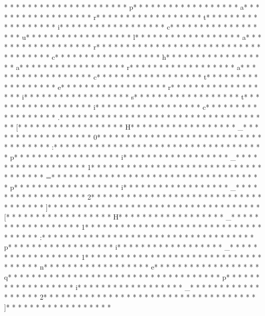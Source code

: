 * *  *  * * *  * * *  * * *  *  * * *  *  * * *  * p* * *  * * *  * * *  *  * * *  *  * * *  * a* * *  * * *  * * *  *  * * *  *  * * *  * r* * *  * * *  * * *  *  * * *  *  * * *  * t* * *  * * *  * * *  *  * * *  *  * * *  * i* * *  * * *  * * *  *  * * *  *  * * *  * c* * *  * * *  * * *  *  * * *  *  * * *  * u* * *  * * *  * * *  *  * * *  *  * * *  * l* * *  * * *  * * *  *  * * *  *  * * *  * a* * *  * * *  * * *  *  * * *  *  * * *  * r* * *  * * *  * * *  *  * * *  *  * * *  *  * * *  * * *  * * *  *  * * *  *  * * *  * c* * *  * * *  * * *  *  * * *  *  * * *  * h* * *  * * *  * * *  *  * * *  *  * * *  * a* * *  * * *  * * *  *  * * *  *  * * *  * r* * *  * * *  * * *  *  * * *  *  * * *  * a* * *  * * *  * * *  *  * * *  *  * * *  * c* * *  * * *  * * *  *  * * *  *  * * *  * t* * *  * * *  * * *  *  * * *  *  * * *  * e* * *  * * *  * * *  *  * * *  *  * * *  * r* * *  * * *  * * *  *  * * *  *  * * *  * i* * *  * * *  * * *  *  * * *  *  * * *  * s* * *  * * *  * * *  *  * * *  *  * * *  * t* * *  * * *  * * *  *  * * *  *  * * *  * i* * *  * * *  * * *  *  * * *  *  * * *  * c* * *  * * *  * * *  *  * * *  *  * * *  * .* * *  * * *  * * *  *  * * *  *  * * *  * 
* * *  * * *  * * *  *  * * *  *  * * *  * [* * *  * * *  * * *  *  * * *  *  * * *  * H* * *  * * *  * * *  *  * * *  *  * * *  * _* * *  * * *  * * *  *  * * *  *  * * *  * 0* * *  * * *  * * *  *  * * *  *  * * *  *  * * *  * * *  * * *  *  * * *  *  * * *  * :* * *  * * *  * * *  *  * * *  *  * * *  *  * * *  * * *  * * *  *  * * *  *  * * *  * p* * *  * * *  * * *  *  * * *  *  * * *  * i* * *  * * *  * * *  *  * * *  *  * * *  * _* * *  * * *  * * *  *  * * *  *  * * *  * 1* * *  * * *  * * *  *  * * *  *  * * *  *  * * *  * * *  * * *  *  * * *  *  * * *  * =* * *  * * *  * * *  *  * * *  *  * * *  *  * * *  * * *  * * *  *  * * *  *  * * *  * p* * *  * * *  * * *  *  * * *  *  * * *  * i* * *  * * *  * * *  *  * * *  *  * * *  * _* * *  * * *  * * *  *  * * *  *  * * *  * 2* * *  * * *  * * *  *  * * *  *  * * *  *  * * *  * * *  * * *  *  * * *  *  * * *  * ]* * *  * * *  * * *  *  * * *  *  * * *  * 
* * *  * * *  * * *  *  * * *  *  * * *  * [* * *  * * *  * * *  *  * * *  *  * * *  * H* * *  * * *  * * *  *  * * *  *  * * *  * _* * *  * * *  * * *  *  * * *  *  * * *  * 1* * *  * * *  * * *  *  * * *  *  * * *  *  * * *  * * *  * * *  *  * * *  *  * * *  * :* * *  * * *  * * *  *  * * *  *  * * *  *  * * *  * * *  * * *  *  * * *  *  * * *  * p* * *  * * *  * * *  *  * * *  *  * * *  * i* * *  * * *  * * *  *  * * *  *  * * *  * _* * *  * * *  * * *  *  * * *  *  * * *  * 1* * *  * * *  * * *  *  * * *  *  * * *  *  * * *  * * *  * * *  *  * * *  *  * * *  * n* * *  * * *  * * *  *  * * *  *  * * *  * e* * *  * * *  * * *  *  * * *  *  * * *  * q* * *  * * *  * * *  *  * * *  *  * * *  *  * * *  * * *  * * *  *  * * *  *  * * *  * p* * *  * * *  * * *  *  * * *  *  * * *  * i* * *  * * *  * * *  *  * * *  *  * * *  * _* * *  * * *  * * *  *  * * *  *  * * *  * 2* * *  * * *  * * *  *  * * *  *  * * *  *  * * *  * * *  * * *  *  * * *  *  * * *  * ]* * *  * * *  * * *  *  * * *  *  * * *  * 
